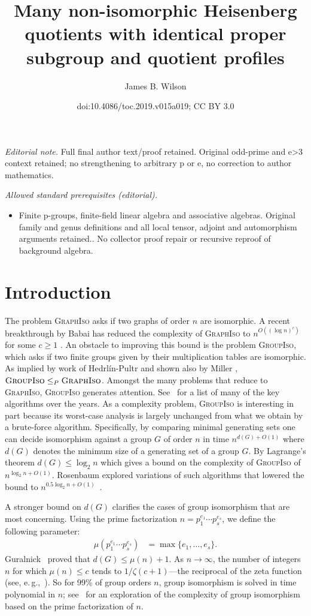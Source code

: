 \documentclass[11pt]{article}
\title{Many non-isomorphic Heisenberg quotients with identical proper subgroup and quotient profiles}
\author{James B. Wilson}
\date{doi:10.4086/toc.2019.v015a019; CC BY 3.0}
\numberwithin{equation}{section}
\theoremstyle{definition}
\theoremstyle{plain}
\newcommand{\eg}{e.\,g.}
\numberwithin{equation}{section}
\theoremstyle{plain}       %
\theoremstyle{remark}
\theoremstyle{definition}
\numberwithin{figure}{section}
\numberwithin{table}{section}
\begin{document}
\maketitle
\noindent\textit{Editorial note.} Full final author text/proof retained. Original odd-prime and e>3 context retained; no strengthening to arbitrary p or e, no correction to author mathematics.\par\medskip
\noindent\textit{Allowed standard prerequisites (editorial).}\begin{itemize}
\item Finite p-groups, finite-field linear algebra and associative algebras. Original family and genus definitions and all local tensor, adjoint and automorphism arguments retained.. No collector proof repair or recursive reproof of background algebra.
\end{itemize}\medskip
\section{Introduction}
The problem \textsc{GraphIso} asks if two graphs of order $n$ are isomorphic.  A
recent breakthrough  by Babai has reduced the complexity of \textsc{GraphIso} to
$n^{O((\log n)^c)}$ for some $c\geq 1$ \cite{Babai:graph}.  An obstacle to
improving this bound is the problem \textsc{GroupIso}, which asks if two finite
groups  given by their multiplication tables are isomorphic.  As implied by work
of Hedrl\'in-Pultr \cite{PH} and shown also by Miller \cite{Miller},
$\textsc{GroupIso}\leq_P \textsc{GraphIso}$.  Amongst the many problems that
reduce to \textsc{GraphIso}, \textsc{GroupIso} generates attention.  See~\cite{ELGOB} for a list of many of the key algorithms over the years.  As a
complexity problem, \textsc{GroupIso} is interesting in part because its
worst-case analysis is largely unchanged from what we obtain by a brute-force
algorithm.  Specifically, by comparing minimal generating sets one can decide
isomorphism against a group $G$ of order $n$ in time $n^{d(G)+O(1)}$ where
$d(G)$ denotes the minimum size of a generating set of a group $G$.  By
Lagrange's theorem $d(G)\leq \log_2 n$ which gives a bound on the complexity of
\textsc{GroupIso} of $n^{\log_2 n+O(1)}$. Rosenbaum explored variations of such
algorithms that lowered the bound to $n^{0.5\log_2 n+O(1)}$~\cite{Rosenbaum}.

A stronger bound on $d(G)$ clarifies the cases of group isomorphism that are
most concerning.  Using the prime factorization $n=p_1^{e_1}\cdots p_s^{e_s}$,
we define the following parameter:
\begin{align}\label{def:mu}
	\mu(p_1^{e_1}\cdots p_s^{e_s}) & =\max\{e_1,\dots, e_s\}.
\end{align}
Guralnick~\cite{Guralnick} proved that $d(G)\leq \mu(n)+1$.  As
$n\to\infty$, the number of integers $n$ for which $\mu(n)\leq c$
tends to $1/\zeta(c+1)$---the reciprocal of the zeta
%
function (see, \eg,~\cite{Stark}).  %
So for 99\% of group orders $n$, group isomorphism is
solved in time polynomial in $n$; 
%
see~\cite{DW:cubefree, DW:most}    %
for an exploration of the complexity of group isomorphism based on the
prime factorization of $n$.
\end{document}
